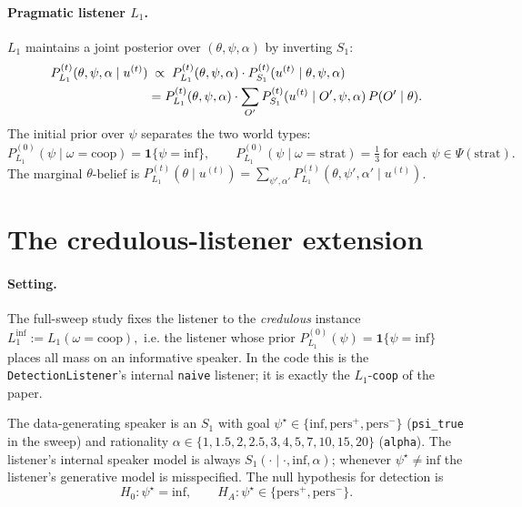 \documentclass[11pt]{article}
\newcommand{\Obs}{O}                 %
\newcommand{\Utt}{u}                 %
\newcommand{\SOne}{S_1}
\newcommand{\LOne}{L_1}
\newcommand{\Pspk}[2]{P^{(#2)}_{#1}}
\newcommand{\ind}{\mathbf{1}}
\newcommand{\Inffn}{\mathrm{inf}}
\begin{document}
\paragraph{Pragmatic listener $\LOne$.}
$\LOne$ maintains a joint posterior over $(\theta, \psi, \alpha)$ by
inverting $\SOne$:
\begin{align}
    \Pspk{\LOne}{t}(\theta,\psi,\alpha \mid \Utt^{(t)})
    &\;\propto\;
    \Pspk{\LOne}{t}(\theta,\psi,\alpha) \cdot
    \Pspk{\SOne}{t}(\Utt^{(t)} \mid \theta, \psi, \alpha)
    \label{eq:l1-posterior}\\
    &= \Pspk{\LOne}{t}(\theta,\psi,\alpha) \cdot
    \sum_{\Obs'} \Pspk{\SOne}{t}(\Utt^{(t)} \mid \Obs', \psi, \alpha)\,
                 P(\Obs' \mid \theta).
    \notag
\end{align}
The initial prior over $\psi$ separates the two world types:
\[
    \Pspk{\LOne}{0}(\psi \mid \omega = \mathrm{coop})
    = \ind\{\psi = \Inffn\},
    \qquad
    \Pspk{\LOne}{0}(\psi \mid \omega = \mathrm{strat})
    = \tfrac{1}{3}\ \text{for each } \psi \in \Psi(\mathrm{strat}).
\]
The marginal $\theta$-belief is
$\Pspk{\LOne}{t}(\theta \mid \Utt^{(t)}) = \sum_{\psi',\alpha'} \Pspk{\LOne}{t}(\theta, \psi', \alpha' \mid \Utt^{(t)})$.

\section{The credulous-listener extension}

\paragraph{Setting.} The full-sweep study fixes the listener to the
\emph{credulous} instance
\(
    \LOne^{\Inffn} := \LOne(\omega = \mathrm{coop}),
\)
i.e. the listener whose prior $\Pspk{\LOne}{0}(\psi) = \ind\{\psi = \Inffn\}$
places all mass on an informative speaker. In the code this is the
\texttt{DetectionListener}'s internal \texttt{naive} listener; it is
exactly the \(L_1\)-\texttt{coop} of the paper.

The data-generating speaker is an $\SOne$ with goal
\(
    \psi^{\star} \in \{\Inffn, \text{pers}^{+}, \text{pers}^{-}\}
\)
(\texttt{psi\_true} in the sweep) and rationality
$\alpha \in \{1, 1.5, 2, 2.5, 3, 4, 5, 7, 10, 15, 20\}$
(\texttt{alpha}). The listener's internal speaker model is always
$\SOne(\cdot \mid \cdot, \Inffn, \alpha)$; whenever $\psi^{\star} \neq
\Inffn$ the listener's generative model is misspecified. The null
hypothesis for detection is
\[
    H_0 : \psi^{\star} = \Inffn, \qquad
    H_A : \psi^{\star} \in \{\text{pers}^{+}, \text{pers}^{-}\}.
\]
\end{document}
